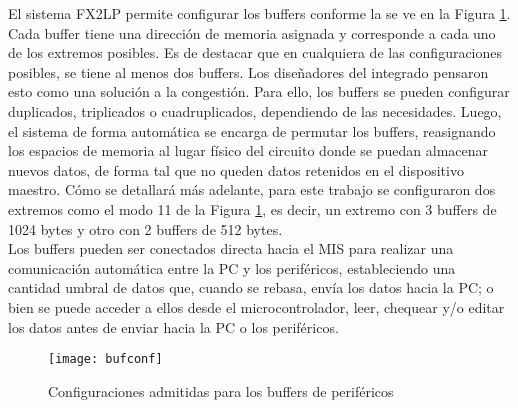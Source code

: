 		El sistema FX2LP permite configurar los buffers conforme la se ve en la Figura \ref{epconfigs}. Cada buffer tiene una dirección de memoria asignada y corresponde a cada uno de los extremos posibles. Es de destacar que en cualquiera de las configuraciones posibles, se tiene al menos dos buffers. Los diseñadores del integrado pensaron esto como una solución a la congestión. Para ello, los buffers se pueden configurar duplicados, triplicados o cuadruplicados, dependiendo de las necesidades. Luego, el sistema de forma automática se encarga de permutar los buffers, reasignando los espacios de memoria al lugar físico del circuito donde se puedan almacenar nuevos datos, de forma tal que no queden datos retenidos en el dispositivo maestro. Cómo se detallará más adelante, para este trabajo se configuraron dos extremos como el modo 11 de la Figura \ref{epconfigs}, es decir, un extremo con 3 buffers de 1024 bytes y otro con 2 buffers de 512 bytes.\\
		
		Los buffers pueden ser conectados directa hacia el MIS para realizar una comunicación automática entre la PC y los periféricos, estableciendo una cantidad umbral de datos que, cuando se rebasa, envía los datos hacia la PC; o bien se puede acceder a ellos desde el microcontrolador, leer, chequear y/o editar los datos antes de enviar hacia la PC o los periféricos.\\
			
		\begin{figure}[h]
			\centering
			\texttt{[image: bufconf]}
			\caption{Configuraciones admitidas para los buffers de periféricos}
			\label{epconfigs}
		\end{figure}